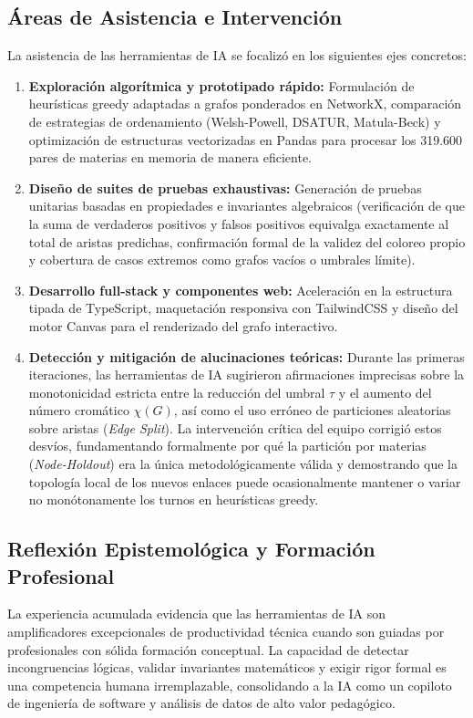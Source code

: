 \documentclass[11pt,a4paper]{article}
\begin{document}
\subsection{Áreas de Asistencia e Intervención}
La asistencia de las herramientas de IA se focalizó en los siguientes ejes concretos:
\begin{enumerate}
    \item \textbf{Exploración algorítmica y prototipado rápido:} Formulación de heurísticas greedy adaptadas a grafos ponderados en NetworkX, comparación de estrategias de ordenamiento (Welsh-Powell, DSATUR, Matula-Beck) y optimización de estructuras vectorizadas en Pandas para procesar los 319.600 pares de materias en memoria de manera eficiente.
    \item \textbf{Diseño de suites de pruebas exhaustivas:} Generación de pruebas unitarias basadas en propiedades e invariantes algebraicos (verificación de que la suma de verdaderos positivos y falsos positivos equivalga exactamente al total de aristas predichas, confirmación formal de la validez del coloreo propio y cobertura de casos extremos como grafos vacíos o umbrales límite).
    \item \textbf{Desarrollo full-stack y componentes web:} Aceleración en la estructura tipada de TypeScript, maquetación responsiva con TailwindCSS y diseño del motor Canvas para el renderizado del grafo interactivo.
    \item \textbf{Detección y mitigación de alucinaciones teóricas:} Durante las primeras iteraciones, las herramientas de IA sugirieron afirmaciones imprecisas sobre la monotonicidad estricta entre la reducción del umbral $\tau$ y el aumento del número cromático $\chi(G)$, así como el uso erróneo de particiones aleatorias sobre aristas (\textit{Edge Split}). La intervención crítica del equipo corrigió estos desvíos, fundamentando formalmente por qué la partición por materias (\textit{Node-Holdout}) era la única metodológicamente válida y demostrando que la topología local de los nuevos enlaces puede ocasionalmente mantener o variar no monótonamente los turnos en heurísticas greedy.
\end{enumerate}

\subsection{Reflexión Epistemológica y Formación Profesional}
La experiencia acumulada evidencia que las herramientas de IA son amplificadores excepcionales de productividad técnica cuando son guiadas por profesionales con sólida formación conceptual. La capacidad de detectar incongruencias lógicas, validar invariantes matemáticos y exigir rigor formal es una competencia humana irremplazable, consolidando a la IA como un copiloto de ingeniería de software y análisis de datos de alto valor pedagógico.
\end{document}
